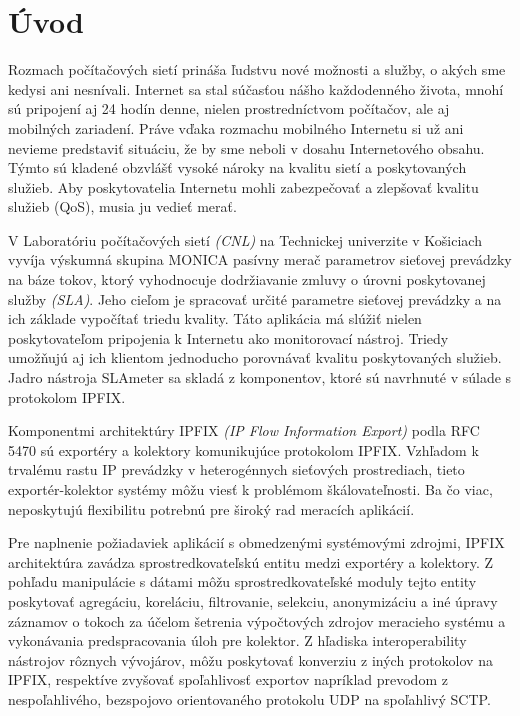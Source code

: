 \setcounter{page}{1}
\setcounter{equation}{0}
\setcounter{figure}{0}
\setcounter{table}{0}

\section*{\'Uvod}

Rozmach počítačových sietí prináša ľudstvu nové možnosti a služby, o akých sme kedysi ani nesnívali.
Internet sa stal súčasťou nášho každodenného života, mnohí sú pripojení aj 24 hodín denne, nielen 
prostredníctvom počítačov, ale aj mobilných zariadení. Práve vďaka rozmachu mobilného Internetu si už
ani nevieme predstaviť situáciu, že by sme neboli v dosahu Internetového obsahu. Týmto sú kladené 
obzvlášť vysoké nároky na kvalitu sietí a poskytovaných služieb. Aby poskytovatelia Internetu mohli 
zabezpečovať a zlepšovať kvalitu služieb (QoS), musia ju vedieť merať.

V Laboratóriu počítačových sietí \emph{(CNL)} na Technickej univerzite v Košiciach vyvíja výskumná 
skupina MONICA pasívny merač parametrov sieťovej prevádzky na báze tokov, ktorý vyhodnocuje 
dodržiavanie zmluvy o úrovni poskytovanej služby \emph{(SLA)}. Jeho cieľom je spracovať určité parametre 
sieťovej prevádzky a na ich základe vypočítať triedu kvality. Táto aplikácia má slúžiť nielen poskytovateľom 
pripojenia k Internetu ako monitorovací nástroj. Triedy umožňujú aj ich klientom jednoducho 
porovnávať kvalitu poskytovaných služieb. Jadro nástroja SLAmeter sa skladá z komponentov, ktoré sú 
navrhnuté v súlade s protokolom IPFIX. \citep{slameter}

Komponentmi architektúry IPFIX \emph{(IP Flow Information Export)} podla RFC 5470 \citep{rfc5470}
sú exportéry a kolektory komunikujúce protokolom IPFIX. Vzhľadom k trvalému rastu IP prevádzky
v heterogénnych sieťových prostrediach, tieto exportér-kolektor systémy môžu viesť k problémom 
škálovateľnosti. Ba čo viac, neposkytujú flexibilitu potrebnú pre široký rad meracích aplikácií.

Pre naplnenie požiadaviek aplikácií s obmedzenými systémovými zdrojmi, IPFIX architektúra zavádza 
sprostredkovateľskú entitu medzi exportéry a kolektory. Z pohľadu manipulácie s dátami môžu sprostredkovateľské
moduly tejto entity poskytovať agregáciu, koreláciu, filtrovanie, selekciu, anonymizáciu a iné úpravy záznamov o 
tokoch za účelom 
šetrenia výpočtových zdrojov meracieho systému a vykonávania predspracovania úloh pre kolektor. Z hľadiska
interoperability nástrojov rôznych vývojárov, môžu poskytovať konverziu z iných protokolov na IPFIX, 
respektíve zvyšovať spoľahlivosť exportov napríklad prevodom z nespoľahlivého, bezspojovo orientovaného 
protokolu UDP na spoľahlivý SCTP. \citep{rfc6183}

